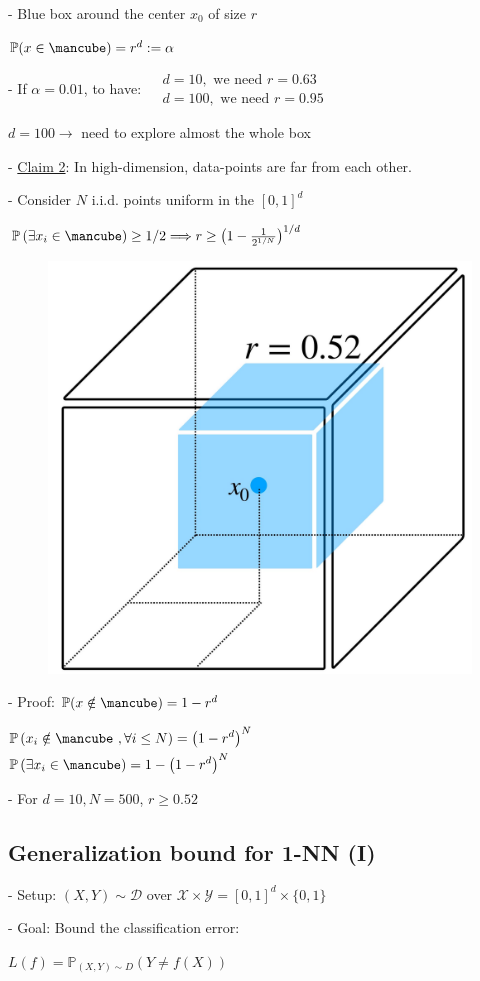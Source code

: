 - Blue box around the center $x_{0}$ of size $r$

$
\mathbb{P}(x \in \mbox{\mancube})=r^{d}:=\alpha
$

- If $\alpha=0.01$, to have:
$
\begin{aligned}
& d=10, \text { we need } r=0.63 \\
& d=100, \text { we need } r=0.95
\end{aligned}
$

$d=100 \rightarrow$ need to explore almost the whole box


- \underline{Claim 2}: In high-dimension, data-points are far from each other.

- Consider $N$ i.i.d. points uniform in the $[0,1]^{d}$

$
\mathbb{P}\left(\exists x_{i} \in \mbox{\mancube}\right) \geq 1 / 2 \Longrightarrow r \geq\left(1-\frac{1}{2^{1 / N}}\right)^{1 / d}
$

\begin{figure} 
    \centering
    \includegraphics[width=0.2\columnwidth]{figures/dim_r=0_52.jpg}
\end{figure}

- Proof: $\mathbb{P}(x \notin \mbox{\mancube})=1-r^{d}$

$
\begin{aligned}
& \mathbb{P}\left(x_{i} \notin \mbox{\mancube}\ , \forall i \leq N\right)=\left(1-r^{d}\right)^{N} \\
& \mathbb{P}\left(\exists x_{i} \in \mbox{\mancube}\right)=1-\left(1-r^{d}\right)^{N}
\end{aligned}
$

- For $d=10, N=500$, $r \geq 0.52$


\subsection*{Generalization bound for 1-NN (I)}
- Setup: $(X, Y) \sim \mathscr{D}$ over $\mathscr{X} \times \mathscr{Y}=[0,1]^{d} \times\{0,1\}$

- Goal: Bound the classification error:

$
L(f)=\mathbb{P}_{(X, Y) \sim D}(Y \neq f(X))
$

